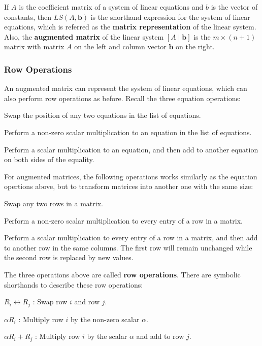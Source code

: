 \documentclass[a4paper,12pt]{article}
\begin{document}
\begin{dft}
  If $A$ is the coefficient matrix of a system of linear equations and $b$ is the vector of constants, then $\mathit{LS}(A,\mathbf{b})$ is the shorthand expression for the system of linear equations, which is referred as the \textbf{matrix representation} of the linear system. Also, the \textbf{augmented matrix} of the linear system $[A\!\mid\!\mathbf{b}]$ is the $m\times(n+1)$ matrix with matrix $A$ on the left and column vector $\mathbf{b}$ on the right.
\end{dft}


\subsubsection{Row Operations}
An augmented matrix can represent the system of linear equations, which can also perform row operations as before. Recall the three equation operations:

\begin{alist}
  \item Swap the position of any two equations in the list of equations.
  \item Perform a non-zero scalar multiplication to an equation in the list of equations.
  \item Perform a scalar multiplication to an equation, and then add to another equation on both sides of the equality.
\end{alist}

For augmented matrices, the following operations works similarly as the equation opertions above, but to transform matrices into another one with the same size:

\begin{alist}
  \item Swap any two rows in a matrix.
  \item Perform a non-zero scalar multiplication to every entry of a row in a matrix.
  \item Perform a scalar multiplication to every entry of a row in a matrix, and then add to another row in the same columns. The first row will remain unchanged while the second row is replaced by new values.
\end{alist}

The three operations above are called \textbf{row operations}. There are symbolic shorthands to describe these row operations:

\begin{alist}
  \item $R_{i}\leftrightarrow R_{j}$ : Swap row $i$ and row $j$.
  \item $\alpha R_{i}$ : Multiply row $i$ by the non-zero scalar $\alpha$.
  \item $\alpha R_{i}+R_{j}$ : Multiply row $i$ by the scalar $\alpha$ and add to row $j$.
\end{alist}
\end{document}
